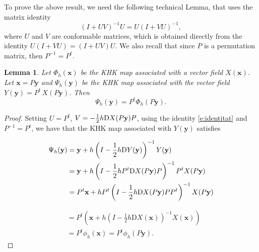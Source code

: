 \documentclass[11pt]{article}
\newtheorem {lemma}  [theorem]{Lemma}
\begin{document}
To prove the above result, we need the following technical Lemma, that uses the matrix identity
\begin{equation}\label{e:identitat}
(I+UV)^{-1}U=U(I+VU)^{-1},
\end{equation}
where $U$ and $V$ are conformable matrices, which is obtained directly from the identity $U(I+VU)=(I+UV)U$. We also recall that since $P$ is a permutation matrix, then $P^{-1}=P^t$.

\begin{lemma}\label{l:noulema}
Let $\Phi_h(\mathbf{x})$ be the KHK map associated with a vector field $X(\mathbf{x})$. Let $\mathbf{x}=P\mathbf{y}$  and $\Psi_h(\mathbf{y})$ be the KHK map associated with the vector field $Y(\mathbf{y})=P^t\,X(P\mathbf{y})$. Then
$$
\Psi_h(\mathbf{y})=P^t\Phi_h(P\mathbf{y}).
$$
\end{lemma}



\begin{proof}
Setting $U=P^t$, $V=-\frac{1}{2}h{\mathrm D}X({P\bf{y}})P$, using the identity \eqref{e:identitat} and $P^{-1}=P^t$, we have that the KHK map associated with $Y(\mathbf{y})$ satisfies

\begin{align*}
\Psi_h(\mathbf{y})&=\mathbf{y}+h\left(I-\frac{1}{2}h {\mathrm D}Y({\bf{y}})\right)^{-1} Y({\bf{y}})\\
&= \mathbf{y}+h\left(I-\frac{1}{2}h P^t{\mathrm D}X({P\bf{y}})P\right)^{-1} P^tX({P\bf{y}})\\
&= P^t\mathbf{x}+hP^t\left(I-\frac{1}{2}h {\mathrm D}X({P\bf{y}})PP^t\right)^{-1} X({P\bf{y}})\\
\end{align*}

\begin{align*}
&= P^t\left(\mathbf{x}+h\left(I-\frac{1}{2}h {\mathrm D}X({\mathbf{x}})\right)^{-1} X({\mathbf{x}})\right)\\
&=P^t\phi_h(\mathbf{x})=P^t\phi_h(P\mathbf{y}).
\end{align*}
\end{proof}
\end{document}
